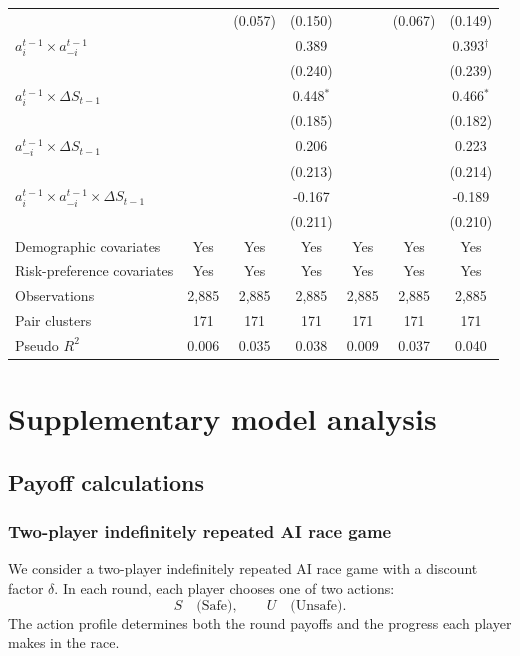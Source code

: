 \documentclass[pdflatex,sn-mathphys-ay]{sn-jnl}
\theoremstyle{thmstyleone}
\theoremstyle{thmstyletwo}
\theoremstyle{thmstylethree}
\begin{document}
\begin{table}[h]
\begin{tabular}{lcccccc}
 &  & (0.057) & (0.150) &  & (0.067) & (0.149) \\
\(a_i^{t-1}\times a_{-i}^{t-1}\) &  &  & 0.389 &  &  & 0.393\(^{\dagger}\) \\
 &  &  & (0.240) &  &  & (0.239) \\
\(a_i^{t-1}\times \Delta S_{t-1}\) &  &  & 0.448\(^{*}\) &  &  & 0.466\(^{*}\) \\
 &  &  & (0.185) &  &  & (0.182) \\
\(a_{-i}^{t-1}\times \Delta S_{t-1}\) &  &  & 0.206 &  &  & 0.223 \\
 &  &  & (0.213) &  &  & (0.214) \\
\(a_i^{t-1}\times a_{-i}^{t-1}\times \Delta S_{t-1}\) &  &  & -0.167 &  &  & -0.189 \\
 &  &  & (0.211) &  &  & (0.210) \\
Demographic covariates & Yes & Yes & Yes & Yes & Yes & Yes \\
Risk-preference covariates & Yes & Yes & Yes & Yes & Yes & Yes \\
Observations & 2,885 & 2,885 & 2,885 & 2,885 & 2,885 & 2,885 \\
Pair clusters & 171 & 171 & 171 & 171 & 171 & 171 \\
Pseudo \(R^2\) & 0.006 & 0.035 & 0.038 & 0.009 & 0.037 & 0.040 \\
\bottomrule
\end{tabular}
\end{table}

\section{Supplementary model analysis}
\label{si:sec:model-analysis}

\subsection{Payoff calculations}
\label{si:expected-payoff-matrix}

\subsubsection{Two-player indefinitely repeated AI race game}

We consider a two-player indefinitely repeated AI race game with a discount factor $\delta$. In each round, each player chooses one of two actions:
\[
S \quad \text{(Safe)}, \qquad U \quad \text{(Unsafe)}.
\]
The action profile determines both the round payoffs and the progress each player makes in the race.
\end{document}

